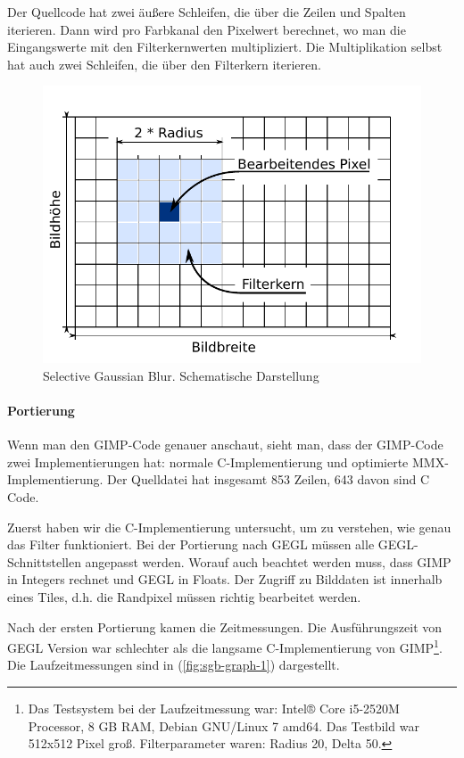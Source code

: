 Der Quellcode hat zwei äußere Schleifen, die über die Zeilen und Spalten iterieren. Dann wird pro Farbkanal den Pixelwert berechnet, wo man die Eingangswerte mit den Filterkernwerten multipliziert. Die Multiplikation selbst hat auch zwei Schleifen, die über den Filterkern iterieren.   


\begin{figure}
\centering
\includegraphics[scale=0.9]{graphs/sgb-grid.pdf}
\caption{Selective Gaussian Blur. Schematische Darstellung}
\label{fig:sgb-grid}
\end{figure} 


\paragraph{Portierung}
Wenn man den GIMP-Code genauer anschaut, sieht man, dass der GIMP-Code zwei Implementierungen hat: normale C-Implementierung und optimierte MMX-Implementierung. Der Quelldatei hat insgesamt 853 Zeilen, 643 davon sind C Code. 

Zuerst haben wir die C-Implementierung untersucht, um zu verstehen, wie genau das Filter funktioniert. Bei der Portierung nach GEGL müssen alle GEGL-Schnittstellen angepasst werden. Worauf auch beachtet werden muss, dass GIMP in Integers rechnet und GEGL in Floats. Der Zugriff zu Bilddaten ist innerhalb eines Tiles, d.h. die Randpixel müssen richtig bearbeitet werden. 

Nach der ersten Portierung kamen die Zeitmessungen. Die Ausführungszeit von GEGL Version war schlechter als die langsame C-Implementierung von GIMP\footnote{Das Testsystem bei der Laufzeitmessung war: Intel® Core i5-2520M Processor, 8 GB RAM, Debian GNU/Linux 7 amd64. Das Testbild war 512x512 Pixel groß. Filterparameter waren: Radius 20, Delta 50.}. Die Laufzeitmessungen sind in (\autoref{fig:sgb-graph-1}) dargestellt.

